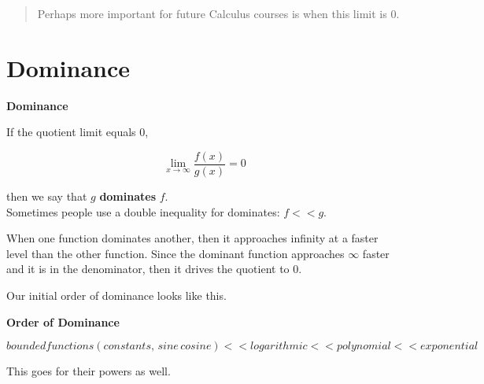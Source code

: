 \documentclass{ximera}
\begin{document}
\begin{quote}

Perhaps more important for future Calculus courses is when this limit is $0$. \\

\end{quote}















\section{Dominance}



\begin{definition}  \textbf{\textcolor{green!50!black}{Dominance}} 

If the quotient limit equals $0$,

\[  \lim_{x \to \infty} \frac{f(x)}{g(x)}  = 0\]

then we say that $g$ \textbf{dominates} $f$. \\



Sometimes people use a double inequality for dominates:  $f << g$.\\

\end{definition}



When one function dominates another, then it approaches infinity at a faster level than the other function.  Since the dominant function approaches $\infty$ faster and it is in the denominator, then it drives the quotient to $0$.


Our initial order of dominance looks like this. \\


\begin{summary} \textbf{\textcolor[rgb]{0.266,0.466,0.666}{Order of Dominance}} 


\[   bounded functions (constants, \, sine \, cosine) << logarithmic << polynomial <<  exponential  \]



This goes for their powers as well.


\end{summary}
\end{document}
